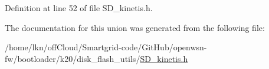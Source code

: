 Definition at line 52 of file S\+D\+\_\+kinetis.\+h.



The documentation for this union was generated from the following file\+:\begin{DoxyCompactItemize}
\item 
/home/lkn/off\+Cloud/\+Smartgrid-\/code/\+Git\+Hub/openwsn-\/fw/bootloader/k20/disk\+\_\+flash\+\_\+utils/\hyperlink{_s_d__kinetis_8h}{S\+D\+\_\+kinetis.\+h}\end{DoxyCompactItemize}
